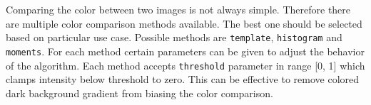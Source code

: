 Comparing the color between two images is not always simple. Therefore there are multiple color comparison methods available. The best one should be selected based on particular use case. Possible methods are \texttt{template}, \texttt{histogram} and \texttt{moments}. For each method certain parameters can be given to adjust the behavior of the algorithm. Each method accepts \texttt{threshold} parameter in range [0, 1] which clamps intensity below threshold to zero. This can be effective to remove colored dark background gradient from biasing the color comparison.
